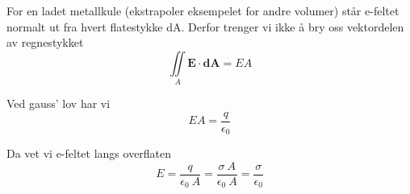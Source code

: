 For en ladet metallkule (ekstrapoler eksempelet for andre volumer)
står e-feltet normalt ut fra hvert flatestykke dA.
Derfor trenger vi ikke å bry oss vektordelen av regnestykket
$$\iint\limits_A \mathbf{E}\cdot\mathbf{dA} = E A$$

Ved gauss' lov har vi
$$E A = \frac{q}{\epsilon_0}$$

Da vet vi e-feltet langs overflaten
$$E = \frac{q}{\epsilon_0\ A}
    = \frac{\sigma\ A}{\epsilon_0\ A}
    = \frac{\sigma}{\epsilon_0}$$
